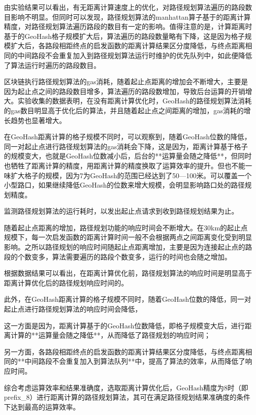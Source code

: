   由实验结果可以看出，有无距离计算速度上的优化，对路径规划算法遍历的路段数目影响不明显。但同时可以发现，路径规划算法的manhattan算子基于的距离计算精度，对路径规划算法遍历路段的数目有一定的影响。值得注意的是，计算距离时基于的GeoHash格子规模扩大后，算法遍历的路段数量略有下降，这是因为格子规模扩大后，各路段相距终点的启发函数的距离计算结果区分度降低，与终点距离相同的中间路段不会重复加入到路径规划算法运行时维护的优先队列中，如此便降低了算法运行时遍历的路段数目。

  区块链执行路径规划算法的gas消耗，随着起止点距离的增加会不断增大，主要是因为起止点之间的路段数目增多，算法遍历的路段数增加，导致后台运算的开销增大。实验收集的数据表明，在没有距离计算优化时，GeoHash的路径规划算法消耗的gas数目明显高于优化后的算法，并且随着起止点之间距离的增加，gas消耗的增长趋势也显著增大。

  ​在GeoHash距离计算的格子规模不同时，可以观察到，随着GeoHash位数的降低，同一对起止点进行路径规划算法的gas消耗会下降，这是因为，距离计算基于格子的规模变大，也就是GeoHash位数减小后，后台的**运算量会随之降低**，但同时也牺牲了距离计算的精度，用距离计算的精度换取了运算效率的提升。但也不能一味扩大格子的规模，因为7为GeoHash的范围已经达到了50—100米。可以覆盖一个小型路口，如果继续降低GeoHash的位数来增大规模，会明显影响路口处的路径规划精度。

  监测路径规划算法的运行耗时，以发出起止点请求到收到路径规划结果为止。

  随着起止点距离的增加，路径规划功能的响应时间会不断增大。在30km的起止点规模下，每一次启发函数的距离计算时间一般不会根据两点之间距离变化受到明显影响。之所以路径规划的响应时间随起止点距离增加，主要是因为连接起止点的路段的个数变多，算法需要遍历的路段个数变多，运行的时间也会随之增加。

  根据数据结果可以看出，在距离计算优化前，路径规划算法的响应时间是明显高于距离计算优化后的路径规划响应时间的。

  此外，在GeoHash距离计算的格子规模不同时，随着GeoHash位数的降低，同一对起止点进行路径规划算法的响应时间会降低，

  这一方面是因为，距离计算基于的GeoHash位数降低，即格子规模变大后，进行距离计算的**运算量会随之降低**，从而降低了路径规划的响应时间；

  另一方面，各路段相距终点的启发函数的距离计算结果区分度降低，与终点距离相同的**中间路段不会重复加入到算法队列**中，提高了算法的效率，从而降低了响应时间。

  综合考虑运算效率和结果准确度，选取距离计算优化后，GeoHash精度为8时（即prefix_8）进行距离计算的路径规划算法，其可在满足路径规划结果准确度的条件下达到最高的运算效率。





